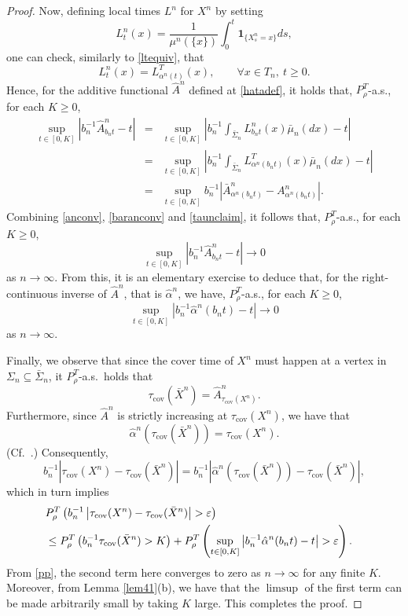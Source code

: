 \documentclass[a4paper, 11pt]{article}
\begin{document}
\begin{proof}
Now, defining local times $L^n$ for $X^n$ by setting
\[{L}^n_{t}(x)=\frac{1}{{\mu}^n(\{x\})}\int_{0}^t\mathbf{1}_{\{{X}^n_s=x\}}ds,\]
one can check, similarly to \eqref{ltequiv}, that
\[{L}^n_{t}(x)=L^T_{\alpha^n(t)}(x),\qquad \forall x\in T_n,\:t\geq 0.\]
Hence, for the additive functional $\hat{A}^n$ defined at \eqref{hatadef}, it holds that, $P^T_{\rho}$-a.s., for each $K\geq 0$,
\begin{eqnarray*}
\sup_{t\in[0,K]}\left|b_n^{-1}\hat{A}^n_{b_nt}-t\right|&=&\sup_{t\in[0,K]}\left|b_n^{-1}\int_{\bar{\Sigma}_n}{L}^n_{b_nt}(x)\bar{\mu}_n(dx)-t\right|\\
&=&\sup_{t\in[0,K]}\left|b_n^{-1}\int_{\bar{\Sigma}_n}L^T_{\alpha^n(b_nt)}(x)\bar{\mu}_n(dx)-t\right|\\
&=&\sup_{t\in[0,K]}b_n^{-1}\left|\bar{A}^n_{\alpha^n(b_nt)}-{A}^n_{\alpha^n(b_nt)}\right|.
\end{eqnarray*}
Combining \eqref{anconv}, \eqref{baranconv} and \eqref{taunclaim}, it follows that, $P^T_{\rho}$-a.s., for each $K\geq 0$,
\[\sup_{t\in[0,K]}\left|b_n^{-1}\hat{A}^n_{b_nt}-t\right|\rightarrow 0\]
as $n\rightarrow\infty$. From this, it is an elementary exercise to deduce that, for the right-continuous inverse of $\hat{A}^n$, that is $\hat{\alpha}^n$, we have, $P^T_{\rho}$-a.s., for each $K\geq 0$,
\begin{equation}\label{pp}
\sup_{t\in[0,K]}\left|b_n^{-1}\hat{\alpha}^n(b_nt)-t\right|\rightarrow 0
\end{equation}
as $n\rightarrow\infty$.

Finally, we observe that since the cover time of $X^n$ must happen at a vertex in $\Sigma_n\subseteq\bar{\Sigma}_n$, it $P^T_{\rho}$-a.s.\ holds that
\begin{equation}\label{tat}
\tau_{\mathrm{cov}}(\bar{X}^n)=\hat{A}^n_{\tau_{\mathrm{cov}}({X}^n)}.
\end{equation}
Furthermore, since $\hat{A}^n$ is strictly increasing at $\tau_{\mathrm{cov}}({X}^n)$, we have that
\[\hat{\alpha}^n\left(\tau_{\mathrm{cov}}(\bar{X}^n)\right)={\tau_{\mathrm{cov}}({X}^n)}.\]
(Cf.\ \cite[Lemma 2.11]{ACMM}.) Consequently,
\[b_n^{-1}\left|\tau_{\mathrm{cov}}({X}^n)-\tau_{\mathrm{cov}}(\bar{X}^n)\right|=b_n^{-1}\left|\hat{\alpha}^n\left(\tau_{\mathrm{cov}}(\bar{X}^n)\right)-{\tau_{\mathrm{cov}}(\bar{X}^n)}\right|,\]
which in turn implies
\begin{align*}
\lefteqn{P^T_{\rho}\left(b_n^{-1}\left|\tau_{\mathrm{cov}}({X}^n)-\tau_{\mathrm{cov}}(\bar{X}^n)\right|>\varepsilon\right)}\\
&\leq P^T_{\rho}\left(b_n^{-1}\tau_{\mathrm{cov}}(\bar{X}^n)>K\right)+P^T_{\rho}\left(\sup_{t\in[0,K]}\left|b_n^{-1}\hat{\alpha}^n(b_nt)-t\right|>\varepsilon\right).
\end{align*}
From \eqref{pp}, the second term here converges to zero as $n\rightarrow\infty$ for any finite $K$. Moreover, from Lemma \ref{lem41}(b), we have that the $\limsup$ of the first term can be made arbitrarily small by taking $K$ large. This completes the proof.
\end{proof}
\end{document}
